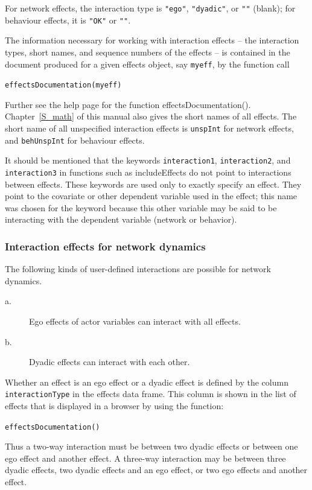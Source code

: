 \documentclass[a4paper,fleqn,11pt]{article}
\newcommand{\+}{\, + \,}
\newcommand{\sfn}[1]{\textsf{#1}}
\begin{document}
For network effects, the interaction type is \texttt{"ego"}, \texttt{"dyadic"},
or \texttt{""} (blank);
for behaviour effects, it is \texttt{"OK"} or \texttt{""}.

The information necessary for working with interaction effects
-- the interaction types, short names, and sequence numbers
of the effects -- is contained in the document produced
for a given effects object, say \texttt{myeff}, by the function call

\verb|effectsDocumentation(myeff)|

\noindent
Further see the help page for the function \sfn{effectsDocumentation()}.
Chapter~\ref{S_math} of this manual also gives the short names of all effects.
The short name of all unspecified interaction effects is \texttt{unspInt}
for network effects, and \texttt{behUnspInt} for behaviour effects.

It should be mentioned that the keywords \texttt{interaction1},
\texttt{interaction2}, and \texttt{interaction3} in functions such as
\sfn{includeEffects} do not point to interactions between effects.
These keywords are used only to exactly specify an effect.
They point to the covariate or other dependent variable used in the effect;
this name was chosen for the keyword because this other variable may
be said to be interacting with the dependent variable (network or behavior).


\subsubsection{Interaction effects for network dynamics}

The following kinds of user-defined interactions are possible
for network dynamics.
\begin{description}
\item[a.]
  Ego effects of actor variables can interact with all effects.
  \item[b.] Dyadic effects can interact with each other.
\end{description}
Whether an effect is an ego effect or a dyadic effect is defined by
the column \texttt{interactionType} in the effects data frame.
This column is shown in the list of effects that is displayed
in a browser by using the function:

\verb|effectsDocumentation()|
\bigskip

Thus a two-way interaction must be between two dyadic effects or between one
ego effect and another effect. A three-way interaction may be between three
dyadic effects, two dyadic effects and an ego effect, or two ego effects and
another effect.
\end{document}
